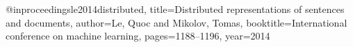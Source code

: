 @inproceedings{le2014distributed,
  title={Distributed representations of sentences and documents},
  author={Le, Quoc and Mikolov, Tomas},
  booktitle={International conference on machine learning},
  pages={1188--1196},
  year={2014}
}